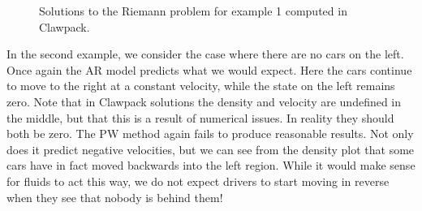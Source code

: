 \documentclass{article}
\begin{document}
\begin{figure}[H]
 \centering
 \caption[Optional caption for list of figures]
 {Solutions to the Riemann problem for example 1 computed in Clawpack.}
  \label{fig:example1_PW}
\end{figure}

In the second example, we consider the case where there are no cars on the left.  Once again the AR model predicts what we would expect.  Here the cars continue to move to the right at a constant velocity, while the state on the left remains zero.  Note that in Clawpack solutions the density and velocity are undefined in the middle, but that this is a result of numerical issues.  In reality they should both be zero.  The PW method again fails to produce reasonable results.  Not only does it predict negative velocities, but we can see from the density plot that some cars have in fact moved backwards into the left region.  While it would make sense for fluids to act this way, we do not expect drivers to start moving in reverse when they see that nobody is behind them!
\end{document}

